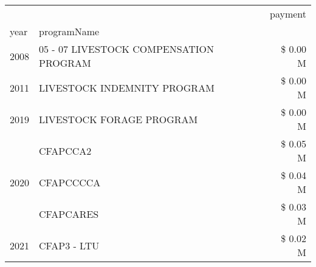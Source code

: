 \begin{tabular}{llr}
\toprule
 &  & payment \\
year & programName &  \\
\midrule
2008 & 05 - 07 LIVESTOCK COMPENSATION PROGRAM & \$ 0.00 M \\
\cline{1-3}
2011 & LIVESTOCK INDEMNITY PROGRAM & \$ 0.00 M \\
\cline{1-3}
2019 & LIVESTOCK FORAGE PROGRAM & \$ 0.00 M \\
\cline{1-3}
\multirow[t]{3}{*}{2020} & CFAPCCA2 & \$ 0.05 M \\
 & CFAPCCCCA & \$ 0.04 M \\
 & CFAPCARES & \$ 0.03 M \\
\cline{1-3}
2021 & CFAP3 - LTU & \$ 0.02 M \\
\cline{1-3}
\bottomrule
\end{tabular}
